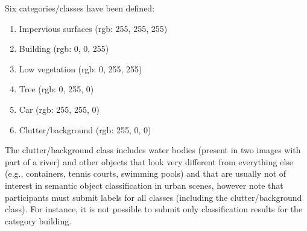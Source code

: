 Six categories/classes have been defined:
\begin{enumerate}
    \item Impervious surfaces (\acrshort{rgb}: 255, 255, 255)
    \item Building (\acrshort{rgb}: 0, 0, 255)
    \item Low vegetation (\acrshort{rgb}: 0, 255, 255)
    \item Tree (\acrshort{rgb}: 0, 255, 0)
    \item Car (\acrshort{rgb}: 255, 255, 0)
    \item Clutter/background (\acrshort{rgb}: 255, 0, 0)
\end{enumerate}
The clutter/background class includes water bodies (present in two images with
part of a river) and other objects that look very different from everything
else (e.g., containers, tennis courts, swimming pools) and that are usually
not of interest in semantic object classification in urban scenes, however note
that participants must submit labels for all classes (including the
clutter/background class). For instance, it is not possible to submit only
classification results for the category building.


